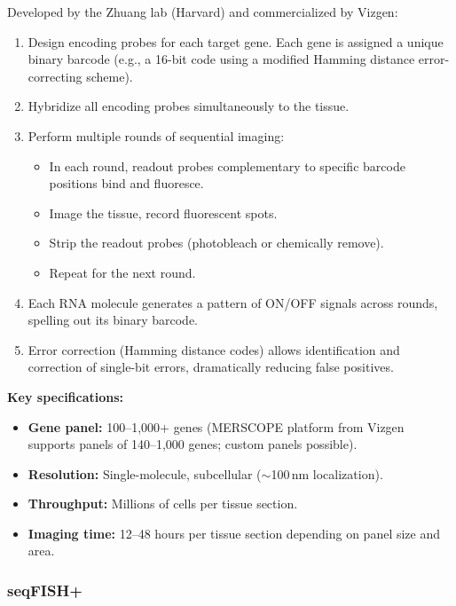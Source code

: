 Developed by the Zhuang lab (Harvard) and commercialized by Vizgen:

\begin{keyconcept}[title={How MERFISH Works}]
\begin{enumerate}[nosep]
  \item Design encoding probes for each target gene. Each gene is assigned a
    unique binary barcode (e.g., a 16-bit code using a modified Hamming
    distance error-correcting scheme).
  \item Hybridize all encoding probes simultaneously to the tissue.
  \item Perform multiple rounds of sequential imaging:
    \begin{itemize}[nosep]
      \item In each round, readout probes complementary to specific barcode
        positions bind and fluoresce.
      \item Image the tissue, record fluorescent spots.
      \item Strip the readout probes (photobleach or chemically remove).
      \item Repeat for the next round.
    \end{itemize}
  \item Each RNA molecule generates a pattern of ON/OFF signals across rounds,
    spelling out its binary barcode.
  \item Error correction (Hamming distance codes) allows identification and
    correction of single-bit errors, dramatically reducing false positives.
\end{enumerate}
\end{keyconcept}

\textbf{Key specifications:}
\begin{itemize}[nosep]
  \item \textbf{Gene panel:} 100--1,000+ genes (MERSCOPE platform from Vizgen
    supports panels of 140--1,000 genes; custom panels possible).
  \item \textbf{Resolution:} Single-molecule, subcellular
    ($\sim$100\,nm localization).
  \item \textbf{Throughput:} Millions of cells per tissue section.
  \item \textbf{Imaging time:} 12--48 hours per tissue section depending on
    panel size and area.
\end{itemize}

\subsubsection{seqFISH+}

